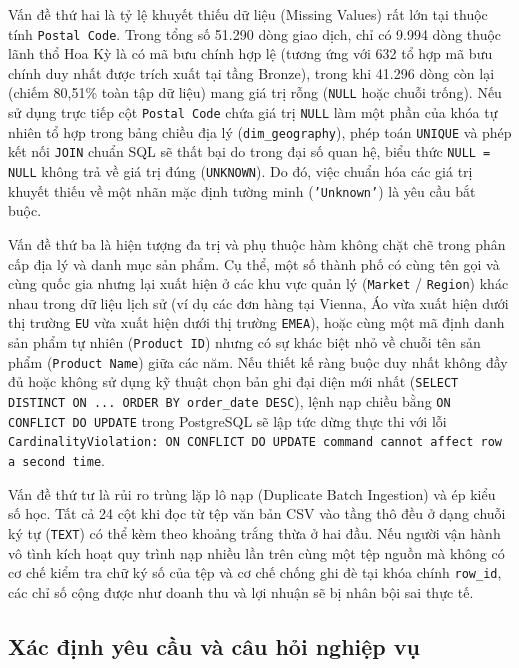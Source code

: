 Vấn đề thứ hai là tỷ lệ khuyết thiếu dữ liệu (Missing Values) rất lớn tại thuộc tính \texttt{Postal Code}. Trong tổng số 51.290 dòng giao dịch, chỉ có 9.994 dòng thuộc lãnh thổ Hoa Kỳ là có mã bưu chính hợp lệ (tương ứng với 632 tổ hợp mã bưu chính duy nhất được trích xuất tại tầng Bronze), trong khi 41.296 dòng còn lại (chiếm 80,51\% toàn tập dữ liệu) mang giá trị rỗng (\texttt{NULL} hoặc chuỗi trống). Nếu sử dụng trực tiếp cột \texttt{Postal Code} chứa giá trị \texttt{NULL} làm một phần của khóa tự nhiên tổ hợp trong bảng chiều địa lý (\texttt{dim\_geography}), phép toán \texttt{UNIQUE} và phép kết nối \texttt{JOIN} chuẩn SQL sẽ thất bại do trong đại số quan hệ, biểu thức \texttt{NULL = NULL} không trả về giá trị đúng (\texttt{UNKNOWN}). Do đó, việc chuẩn hóa các giá trị khuyết thiếu về một nhãn mặc định tường minh (\texttt{'Unknown'}) là yêu cầu bắt buộc.

Vấn đề thứ ba là hiện tượng đa trị và phụ thuộc hàm không chặt chẽ trong phân cấp địa lý và danh mục sản phẩm. Cụ thể, một số thành phố có cùng tên gọi và cùng quốc gia nhưng lại xuất hiện ở các khu vực quản lý (\texttt{Market} / \texttt{Region}) khác nhau trong dữ liệu lịch sử (ví dụ các đơn hàng tại Vienna, Áo vừa xuất hiện dưới thị trường \texttt{EU} vừa xuất hiện dưới thị trường \texttt{EMEA}), hoặc cùng một mã định danh sản phẩm tự nhiên (\texttt{Product ID}) nhưng có sự khác biệt nhỏ về chuỗi tên sản phẩm (\texttt{Product Name}) giữa các năm. Nếu thiết kế ràng buộc duy nhất không đầy đủ hoặc không sử dụng kỹ thuật chọn bản ghi đại diện mới nhất (\texttt{SELECT DISTINCT ON ... ORDER BY order\_date DESC}), lệnh nạp chiều bằng \texttt{ON CONFLICT DO UPDATE} trong PostgreSQL sẽ lập tức dừng thực thi với lỗi \texttt{CardinalityViolation: ON CONFLICT DO UPDATE command cannot affect row a second time}.

Vấn đề thứ tư là rủi ro trùng lặp lô nạp (Duplicate Batch Ingestion) và ép kiểu số học. Tất cả 24 cột khi đọc từ tệp văn bản CSV vào tầng thô đều ở dạng chuỗi ký tự (\texttt{TEXT}) có thể kèm theo khoảng trắng thừa ở hai đầu. Nếu người vận hành vô tình kích hoạt quy trình nạp nhiều lần trên cùng một tệp nguồn mà không có cơ chế kiểm tra chữ ký số của tệp và cơ chế chống ghi đè tại khóa chính \texttt{row\_id}, các chỉ số cộng được như doanh thu và lợi nhuận sẽ bị nhân bội sai thực tế.

\subsection{Xác định yêu cầu và câu hỏi nghiệp vụ}

